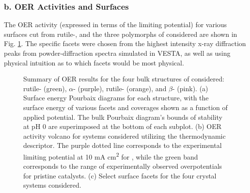 
\subsubsection{b. OER Activities and Surfaces}

The OER activity (expressed in terms of the limiting potential) for various surfaces cut from rutile-, and the three polymorphs of  considered are shown in Fig. \ref{fig:oer_volcano}.
The specific facets were chosen from the highest intensity x-ray diffraction peaks from powder-diffraction spectra simulated in VESTA,
as well as using physical intuition as to which facets would be most physical.


\begin{figure}
\centering
{}
\caption{\label{fig:oer_volcano}
Summary of OER results for the four bulk structures of \IrOx considered: rutile- (green), $\alpha$- (purple), rutile- (orange), and $\beta$- (pink).
(a) Surface energy Pourbaix diagrams for each structure, with the surface energy of various facets and coverages shown as a function of applied potential.
The bulk Pourbaix diagram's bounds of stability at pH 0 are superimposed at the bottom of each subplot.
(b) OER activity volcano for \IrOx systems considered utilizing the \DGOmOH thermodynamic descriptor.
The purple dotted line corresponds to the experimental limiting potential at 10 mA cm\textsuperscript{2} for , %
while the green band corresponds to the range of experimentally observed overpotentials for pristine  catalysts.  %
(c) Select surface facets for the four \IrOx crystal systems considered.
}
\end{figure}

